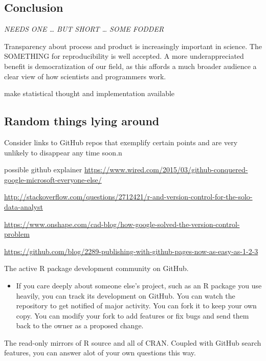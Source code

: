 \documentclass[12pt]{article}
\providecommand{\tightlist}{%
  \setlength{\itemsep}{0pt}\setlength{\parskip}{0pt}}
\begin{document}
\subsection{Conclusion}\label{conclusion}

\emph{NEEDS ONE \ldots{} BUT SHORT \ldots{} SOME FODDER}

Transparency about process and product is increasingly important in
science. The SOMETHING for reproducibility is well accepted. A more
underappreciated benefit is democratization of our field, as this
affords a much broader audience a clear view of how scientists and
programmers work.

make statistical thought and implementation available

\subsection{Random things lying
around}\label{random-things-lying-around}

Consider links to GitHub repos that exemplify certain points and are
very unlikely to disappear any time soon.n

possible github explainer
\url{https://www.wired.com/2015/03/github-conquered-google-microsoft-everyone-else/}

\url{http://stackoverflow.com/questions/2712421/r-and-version-control-for-the-solo-data-analyst}

\url{https://www.onshape.com/cad-blog/how-google-solved-the-version-control-problem}

\url{https://github.com/blog/2289-publishing-with-github-pages-now-as-easy-as-1-2-3}

The active R package development community on GitHub.

\begin{itemize}
\tightlist
\item
  If you care deeply about someone else's project, such as an R package
  you use heavily, you can track its development on GitHub. You can
  watch the repository to get notified of major activity. You can fork
  it to keep your own copy. You can modify your fork to add features or
  fix bugs and send them back to the owner as a proposed change.
\end{itemize}

The read-only mirrors of R source and all of CRAN. Coupled with GitHub
search features, you can answer alot of your own questions this way.



\end{document}
